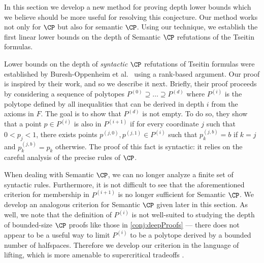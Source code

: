 %
In this section we develop a new method for proving depth lower bounds which we believe should be more useful for resolving this conjecture. Our method works not only for $\CP$ but also for semantic $\CP$. Using our technique, we establish the first linear lower bounds on the depth of Semantic $\CP$ refutations of the Tseitin formulas. 

Lower bounds on the depth of \emph{syntactic} $\CP$ refutations
of Tseitin formulas were established by
%
Buresh-Oppenheim   %
et al.~\cite{BGHMP06} using a rank-based argument. Our proof is inspired by their work, and so we describe it next. 
Briefly, their proof proceeds by considering a sequence of polytopes $P^{(0)} \supseteq \ldots \supseteq P^{(d)}$ where $P^{(i)}$ is the polytope defined by all inequalities that can be derived in depth $i$ from the axioms in $F$. The goal is to show that $P^{(d)}$ is not empty. To do so, they show that a point $p \in P^{(i)}$ is also in $P^{(i+1)}$ if for every coordinate $j$ such that $0< p_j<1$, there exists points $p^{(j,0)}, p^{(j,1)} \in P^{(i)}$ such that $p^{(j,b)}_k = b$ if $k = j$ and $p^{(j,b)}_k = p_k$ otherwise. The proof of this fact is syntactic: it relies on the careful analysis of the precise rules of $\CP$.

%

When dealing with Semantic $\CP$, we can no longer analyze a finite set of syntactic rules. Furthermore, it is not difficult to see that the aforementioned criterion for membership in $P^{(i+1)}$ is no longer sufficient for Semantic $\CP$. We develop an analogous criterion for Semantic $\CP$ given later in this section. 
As well, we note that the definition of $P^{(i)}$ is not well-suited to studying the depth of bounded-size  $\CP$ proofs like those in \autoref{conj:deepProofs} --- there does not appear to be a useful way to limit $P^{(i)}$ to be a polytope derived by a bounded number of halfspaces. Therefore we develop our criterion in the language of lifting, which is more amenable to supercritical tradeoffs \cite{Razborov16,BerkholzN20}.
%
%
%
%
%
	
	 
	
